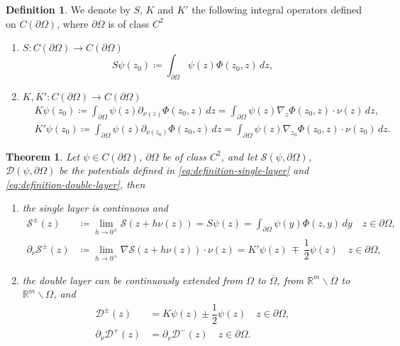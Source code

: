\documentclass[10pt, a4paper]{article} %
\numberwithin{equation}{section}
\theoremstyle{definition}
\newtheorem{definition}[subsection]{Definition}
\theoremstyle{plain}
\newtheorem{theorem}[subsection]{Theorem}
\theoremstyle{plain}
\theoremstyle{plain}
\theoremstyle{plain}
\theoremstyle{plain}
\theoremstyle{plain}
\theoremstyle{plain}
\theoremstyle{plain}
\begin{document}
\begin{definition}
 We denote by $S$, $K$  and $K'$ the following integral operators 
 defined on $C(\partial \Omega)$, where $\partial \Omega$ is of class $C^2$
 \begin{enumerate}
  \item  $ S: C(\partial \Omega) \to C(\partial \Omega)$
  \begin{equation}
  S\psi(z_0)\coloneqq\int_{\partial \Omega}\psi(z) \Phi(z_0,z)\,dz,\label{def:operator-S}
  \end{equation}
  \item  $ K,K':C(\partial \Omega) \to C(\partial \Omega)$
  \begin{align}
  & K\psi(z_0)\coloneqq\int_{\partial \Omega} \psi(z) \partial_{\nu(z)} \Phi(z_0, z) \,dz =
  \int_{\partial \Omega} \psi(z) \nabla_z\Phi(z_0, z)\cdot\nu(z) \,dz,\label{def:operator-K}\\
  & K'\psi(z_0)\coloneqq\int_{\partial \Omega} \psi(z) \partial_{\nu(z_0)} \Phi(z_0, z) \,dz =
  \int_{\partial \Omega} \psi(z) \nabla_{z_0}\Phi(z_0, z)\cdot\nu(z_0) \,dz.\label{def:operator-K'}
  \end{align}
 \end{enumerate}
\end{definition}
\begin{theorem}
\label{theo:jump-relations}
 Let $\psi\in C(\partial \Omega)$, $\partial \Omega$ be of class $C^2$, and let 
 $\mathcal{S}(\psi,\partial \Omega)$, $\mathcal{D}(\psi,\partial \Omega)$ be the potentials 
 defined in \eqref{eq:definition-single-layer} and \eqref{eq:definition-double-layer}, then
 \begin{enumerate}
  \item the single layer is continuous and 
  \begin{subequations}
  \begin{align}
   \mathcal{S}^\pm(z) &\coloneqq\lim_{h\to 0^\pm}\mathcal{S}(z+h\nu(z)) = S\psi(z)=\int_{\partial \Omega}\psi(y)\Phi(z,y)\,dy \quad z\in\partial \Omega, \label{eq:single-pm-0}\\
   \partial_\nu\mathcal{S}^\pm(z) &\coloneqq \lim_{h\to0^\pm} \nabla\mathcal{S}(z+h\nu(z))\cdot\nu(z) =  K'\psi(z) \,\mp\,\dfrac{1}{2}\psi(z) \quad z\in\partial \Omega,\label{eq:single-pm-1}
  \end{align}
 \end{subequations}
 \item the double layer can be continuously extended from $\Omega$ to $\overline{\Omega}$, from $\mathbb{R}^m\backslash \overline{\Omega}$ to $\mathbb{R}^m\backslash \Omega$, and
  \begin{subequations}
  \begin{align}
   \mathcal{D}^\pm(z) &= K\psi(z) \pm\dfrac{1}{2}\psi(z)\quad z\in\partial \Omega, \label{eq:double-pm-0}\\
   \partial_\nu\mathcal{D}^+(z) &= \partial_\nu\mathcal{D}^-(z) \quad z\in\partial \Omega. \label{eq:double-pm-1}
  \end{align}
  \end{subequations}
 \end{enumerate}
\end{theorem}
\end{document}
